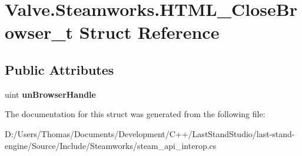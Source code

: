 \hypertarget{structValve_1_1Steamworks_1_1HTML__CloseBrowser__t}{}\section{Valve.\+Steamworks.\+H\+T\+M\+L\+\_\+\+Close\+Browser\+\_\+t Struct Reference}
\label{structValve_1_1Steamworks_1_1HTML__CloseBrowser__t}
\subsection*{Public Attributes}
\begin{DoxyCompactItemize}
\item 
\hypertarget{structValve_1_1Steamworks_1_1HTML__CloseBrowser__t_a72ac3d47ba1b35d31f8e0c670defa646}{}uint {\bfseries un\+Browser\+Handle}\label{structValve_1_1Steamworks_1_1HTML__CloseBrowser__t_a72ac3d47ba1b35d31f8e0c670defa646}

\end{DoxyCompactItemize}


The documentation for this struct was generated from the following file\+:\begin{DoxyCompactItemize}
\item 
D\+:/\+Users/\+Thomas/\+Documents/\+Development/\+C++/\+Last\+Stand\+Studio/last-\/stand-\/engine/\+Source/\+Include/\+Steamworks/steam\+\_\+api\+\_\+interop.\+cs\end{DoxyCompactItemize}
